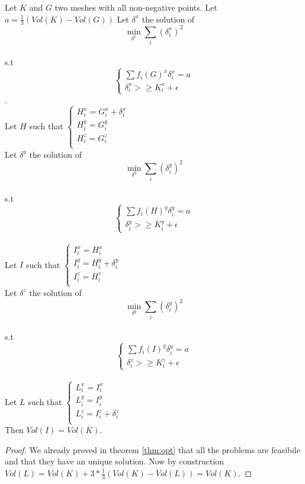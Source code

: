 \documentclass{article}
\begin{document}
\begin{Theorem}\label{thm:vl}
Let $K$ and $G$ two meshes with all non-negative points.
Let $a=\frac{1}{3}(Vol(K)-Vol(G))$
Let $\delta^{x}$ the solution of $$\min_{\delta^{x}} \sum_{i} (\delta_{i}^{x})^{2}$$ \\
s.t  $$\begin{cases}\sum f_{i}(G)^{x} \delta_{i}^{x}=a \\
\delta_{i}^{x}>\ge K^{x}_{i}+\epsilon \end{cases}$$.\\
Let $H$ such that $\begin{cases} H_{i}^{x}=G_{i}^{x}+\delta_{i}^{x}\\
H_{i}^{y}=G_{i}^{y}\\
H_{i}^{z}=G_{i}^{z}\\
\end{cases}$\\
Let $\delta^{y}$ the solution of $$\min_{\delta^{y}} \sum_{i} (\delta_{i}^{y})^{2}$$ \\
s.t  $$\begin{cases}\sum f_{i}(H)^{y}\delta_{i}^{y}=a \\
\delta_{i}^{y}>\ge K^{y}_{i}+\epsilon \end{cases}$$\\
Let $I$ such that $\begin{cases} I_{i}^{x}=H_{i}^{x}\\
I_{i}^{y}=H_{i}^{y}+\delta_{i}^{y}\\
I_{i}^{z}=H_{i}^{z}\\
\end{cases}$\\
Let $\delta^{z}$ the solution of $$\min_{\delta^{y}} \sum_{i} (\delta_{i}^{y})^{2}$$ \\
s.t  $$\begin{cases}\sum f_{i}(I)^{y}\delta_{i}^{y}=a \\
\delta_{i}^{z}>\ge K^{z}_{i}+\epsilon \end{cases}$$\\
Let $L$ such that $\begin{cases} L_{i}^{x}=I_{i}^{x}\\
L_{i}^{y}=I_{i}^{y}\\
L_{i}^{z}=I_{i}^{z}+\delta_{i}^{z}\\
\end{cases}$\\
Then $Vol(I)=Vol(K)$. 
\end{Theorem}
\begin{proof}
We already proved in theorem \ref{thm:opt} that all the problems are feasibile and that they have an unique solution.
Now by construction $Vol(L)=Vol(K)+3*\frac{1}{3}(Vol(K)-Vol(L))=Vol(K)$.
\end{proof}
\end{document}
